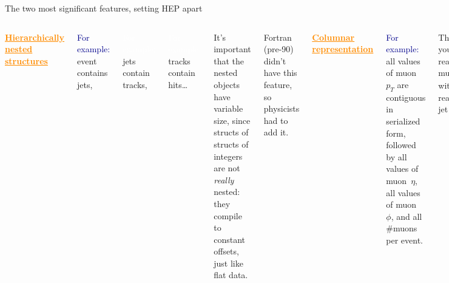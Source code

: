 \documentclass[aspectratio=169]{beamer}
\begin{document}
\begin{frame}{The two most significant features, setting HEP apart}
\vspace{0.5 cm}
\begin{columns}[t]
\textcolor{darkorange}{\bf \underline{\Large Hierarchically nested structures}}

\vspace{0.35 cm}
\textcolor{darkblue}{For example:} event contains jets,

\textcolor{white}{For example:} \hspace{0.5 cm}jets contain tracks,

\textcolor{white}{For example:} \hspace{1 cm}tracks contain hits\ldots

\vspace{0.35 cm}
It's important that the nested objects have variable size, since structs of structs of integers are not {\it really} nested: they compile to constant offsets, just like flat data.

\vspace{0.35 cm}
Fortran (pre-90) didn't have this feature, so physicists had to add it.

\textcolor{darkorange}{\bf \underline{\Large Columnar representation}}

\vspace{0.35 cm}
\textcolor{darkblue}{For example:} all values of muon~$p_T$ are contiguous in serialized form, followed by all values of muon~$\eta$, all values of muon~$\phi$, and all \#muons per event.

\vspace{0.35 cm}
Thus, you can read muon~$p_T$ without reading jet~$p_T$.

\vspace{0.35 cm}
Easy for flat data: it's just a transpose.

\vspace{0.1 cm}
There are several techniques for solving it in general (hot CS topic in early 2000's).
\end{columns}
\end{frame}
\end{document}
